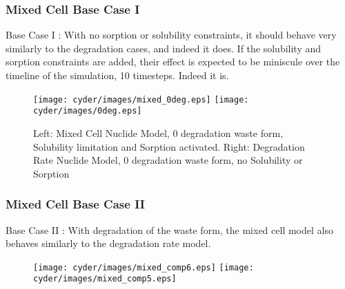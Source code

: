\begin{frame}
  \frametitle{Mixed Cell Base Case I}
  Base Case I : With no sorption or solubility constraints, it should behave very similarly to 
  the degradation cases, and indeed it does. If the solubility and sorption 
  constraints are added, their effect is expected to be miniscule over the 
  timeline of the simulation, 10 timesteps. Indeed it is. 

  \begin{figure}[htbp!]
    \begin{center}
     \texttt{[image: cyder/images/mixed\_0deg.eps]}
     \texttt{[image: cyder/images/0deg.eps]}
     \caption{Left: Mixed Cell Nuclide Model, 0 degradation waste form, Solubility 
     limitation and Sorption activated. Right: Degradation Rate Nuclide Model, 0 degradation waste form, no 
     Solubility or Sorption}
    \end{center}
  \end{figure}
\end{frame}

\begin{frame}
  \frametitle{Mixed Cell Base Case II}
  Base Case II : With degradation of the waste form, the mixed cell model also 
  behaves similarly to the degradation rate model. 

  \begin{figure}[htbp!]
    \begin{center}
     \texttt{[image: cyder/images/mixed\_comp6.eps]}
     \texttt{[image: cyder/images/mixed\_comp5.eps]}
    \end{center}
  \end{figure}
\end{frame}



